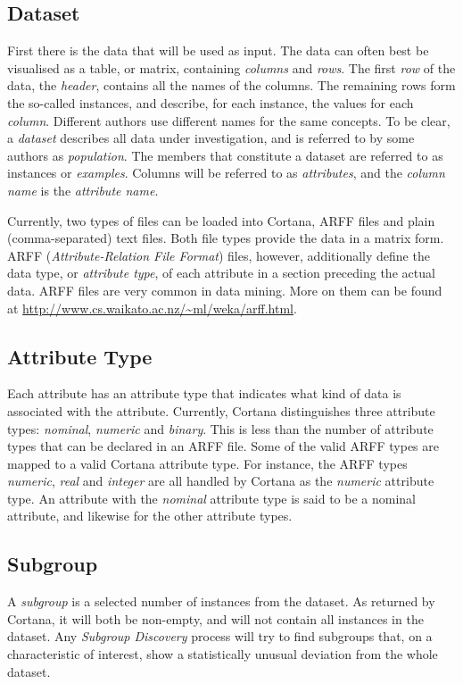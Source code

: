 \documentclass{article}
\begin{document}
\subsection{Dataset}
\label{preliminaries:dataset}
First there is the data that will be used as input.
The data can often best be visualised as a table, or matrix, containing \emph{columns} and \emph{rows}.
The first \emph{row} of the data, the \emph{header}, contains all the names of the columns.
The remaining rows form the so-called instances, and describe, for each instance, the values for each \emph{column}.
Different authors use different names for the same concepts.
To be clear, a \emph{dataset} describes all data under investigation, and is referred to by some authors as \emph{population}.
The members that constitute a dataset are referred to as instances or \emph{examples}.
Columns will be referred to as \emph{attributes}, and the \emph{column name} is the \emph{attribute name}.

Currently, two types of files can be loaded into Cortana, ARFF files and plain (comma-separated) text files.
Both file types provide the data in a matrix form.
ARFF (\emph{Attribute-Relation File Format}) files, however, additionally define the data type, or \emph{attribute type}, of each attribute in a section preceding the actual data.
ARFF files are very common in data mining. More on them can be found at \url{http://www.cs.waikato.ac.nz/~ml/weka/arff.html}.



\subsection{Attribute Type}
\label{preliminaries:attribute-type}
Each attribute has an attribute type that indicates what kind of data is associated with the attribute.
Currently, Cortana distinguishes three attribute types: \emph{nominal}, \emph{numeric} and \emph{binary}.
This is less than the number of attribute types that can be declared in an ARFF file.
Some of the valid ARFF types are mapped to a valid Cortana attribute type.
For instance, the ARFF types \emph{numeric}, \emph{real} and \emph{integer} are all handled by Cortana as the \emph{numeric} attribute type.
An attribute with the \emph{nominal} attribute type is said to be a nominal attribute, and likewise for the other attribute types.



\subsection{Subgroup}
\label{preliminaries:subgroup}
A \emph{subgroup} is a selected number of instances from the dataset.
As returned by Cortana, it will both be non-empty, and will not contain all instances in the dataset.
Any \emph{Subgroup Discovery} process will try to find subgroups that, on a characteristic of interest, show a statistically unusual deviation from the whole dataset.
\end{document}
